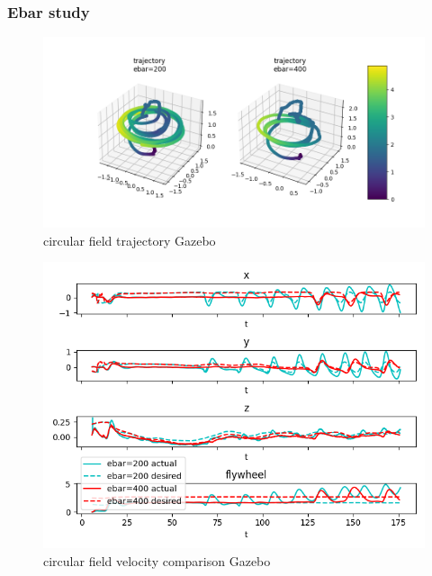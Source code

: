 \subsubsection{Ebar study}
\begin{figure}[h!]
   \centering
   \includegraphics[width=\linewidth]{Images/gazebo_trajectory_ebar_circular.png}
   \caption{circular field trajectory Gazebo}
   \label{fig:trajgazebocircularebar}
\end{figure}
\begin{figure}[h!]
   \centering
   \includegraphics[width=\linewidth]{Images/gazebo_circular_ebar_V.png}
   \caption{circular field velocity comparison Gazebo}
   \label{fig:velgazebocircularebar}
\end{figure}
